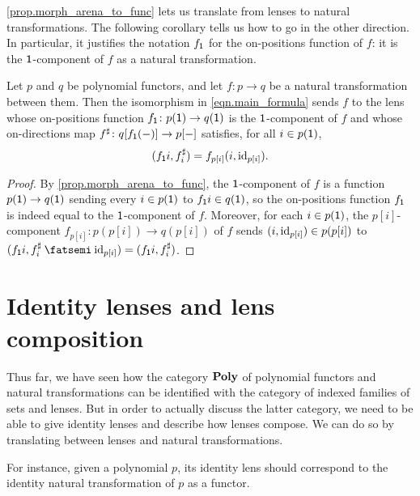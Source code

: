 \documentclass[Book-Poly]{subfiles}
\begin{document}
\cref{prop.morph_arena_to_func} lets us translate from lenses to natural transformations.
The following corollary tells us how to go in the other direction.
In particular, it justifies the notation $f_{\textsf{1}}$ for the on-positions function of $f$: it is the $\textsf{1}$-component of $f$ as a natural transformation.

\begin{corollary} \label{cor.morph_func_to_arena}
Let $p$ and $q$ be polynomial functors, and let $f \colon p \to q$ be a natural transformation between them.
Then the isomorphism in \eqref{eqn.main_formula} sends $f$ to the lens whose on-positions function $f_{\textsf{1}}\colon p(\textsf{1})\to q(\textsf{1})$ is the $\textsf{1}$-component of $f$ and whose on-directions map $f^\sharp\colon q[f_{\textsf{1}}(-)]\to p[-]$ satisfies, for all $i\in p(\textsf{1})$,
\[
    (f_{\textsf{1}}i, f^\sharp_i) = f_{p[i]}(i, \mathrm{id}_{p[i]}).
\]
\end{corollary}
\begin{proof}
By \cref{prop.morph_arena_to_func}, the $\textsf{1}$-component of $f$ is a function $p(\textsf{1})\to q(\textsf{1})$ sending every $i \in p(\textsf{1})$ to $f_{\textsf{1}}i \in q(\textsf{1})$, so the on-positions function $f_{\textsf{1}}$ is indeed equal to the $\textsf{1}$-component of $f$.
Moreover, for each $i\in p(\textsf{1})$, the $p[i]$-component $f_{p[i]} \colon p(p[i]) \to q(p[i])$ of $f$ sends $(i,\mathrm{id}_{p[i]})\in p(p[i])$ to $(f_\1i, f^\sharp_i \then \id_{p[i]}) = (f_\1i, f^\sharp_i)$.
\end{proof}



\section{Identity lenses and lens composition} \label{subsec.poly.cat.morph.id-comp}


Thus far, we have seen how the category $\mathbf{Poly}$ of polynomial functors and natural transformations can be identified with the category of indexed families of sets and lenses.
But in order to actually discuss the latter category, we need to be able to give identity lenses and describe how lenses compose.
We can do so by translating between lenses and natural transformations.

For instance, given a polynomial $p$, its identity lens should correspond to the identity natural transformation of $p$ as a functor.

\end{document}
